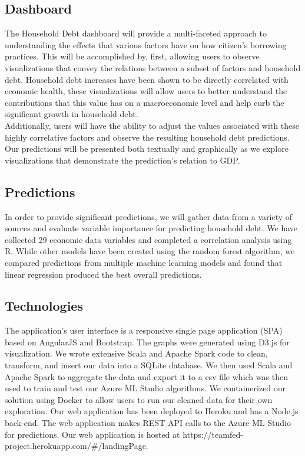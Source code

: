 \documentclass[sigconf,nonacm,11pt]{acmart}
\begin{document}
\subsection{Dashboard}
The Household Debt dashboard will provide a multi-faceted approach to understanding the effects that various factors have on how citizen's borrowing practices.  This will be accomplished by, first, allowing users to observe visualizations that convey the relations between a subset of factors and household debt.  Household debt increases have been shown to be directly correlated with economic health\cite{Mian2015}, these visualizations will allow users to better understand the contributions that this value has on a macroeconomic level and help curb the significant growth in household debt\cite{Alter2018}.\\
Additionally, users will have the ability to adjust the values associated with these highly correlative factors and observe the resulting household debt predictions.  Our predictions will be presented both textually and graphically as we explore visualizations that demonstrate the prediction's relation to GDP.\vspace{-0.5em}

\subsection{Predictions}

In order to provide significant predictions, we will gather data from a variety of sources and evaluate variable importance for predicting household debt. We have collected 29 economic data variables and completed a correlation analysis using R.  While other models have been created using the random forest algorithm\cite{Nyman2018}, we compared predictions from multiple machine learning models and found that linear regression produced the best overall predictions.\vspace{-0.5em}

\subsection{Technologies}

The application's user interface is a responsive single page application (SPA) based on AngularJS and Bootstrap. The graphs were generated using D3.js for visualization. We wrote extensive Scala and Apache Spark code to clean, transform, and insert our data into a SQLite database. We then used Scala and Apache Spark to aggregate the data and export it to a csv file which was then used to train and test our Azure ML Studio algorithms. We containerized our solution using Docker to allow users to run our cleaned data for their own exploration. Our web application has been deployed to Heroku and has a Node.js back-end. The web application makes REST API calls to the Azure ML Studio for predictions. Our web application is hosted at https://teamfed-project.herokuapp.com/\#/landingPage.  
\end{document}
